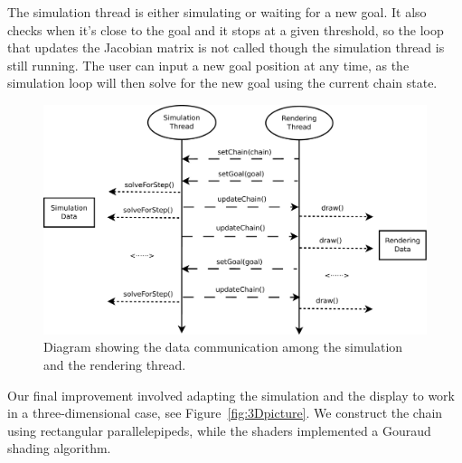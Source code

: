 \documentclass[paper=a4, fontsize=11pt]{scrartcl} %
\numberwithin{equation}{section} %
\numberwithin{figure}{section} %
\numberwithin{table}{section} %
\begin{document}
The simulation thread is either simulating or waiting for a new goal. It also checks when it's close to the goal and it stops at a given threshold, so the loop that updates the Jacobian matrix is not called though the simulation thread is still running. The user can input a new goal position at any time, as the simulation loop will then solve for the new goal using the current chain state.\\

\begin{figure}[h]
\centering
\includegraphics[scale=0.4]{threadDiagram}
\caption{Diagram showing the data communication among the simulation and the rendering thread.}
\label{fig:treadhDiagram}
\end{figure}

Our final improvement involved adapting the simulation and the display to work in a three-dimensional case, see Figure~\ref{fig:3Dpicture}. We construct the chain using rectangular parallelepipeds, while the shaders implemented a Gouraud shading algorithm. 

\end{document}
